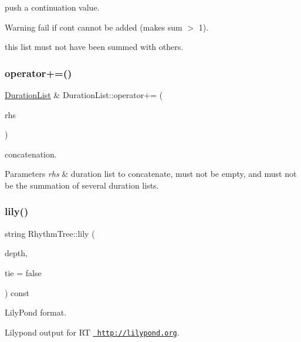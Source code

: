 push a continuation value. 

\begin{DoxyWarning}{Warning}
fail if cont cannot be added (makes sum $>$ 1). 

this list must not have been summed with others. 
\end{DoxyWarning}
\mbox{\label{group__output_ga06ae4f865c1c27edd490f1631d76452a}} 
\subsubsection{\texorpdfstring{operator+=()}{operator+=()}\hspace{0.1cm}{\footnotesize\ttfamily [1/2]}}
{\footnotesize\ttfamily \mbox{\hyperlink{classDurationList}{Duration\+List}} \& Duration\+List\+::operator+= (\begin{DoxyParamCaption}\item[{const \mbox{\hyperlink{classDurationList}{Duration\+List}} \&}]{rhs }\end{DoxyParamCaption})}



concatenation. 


\begin{DoxyParams}{Parameters}
{\em rhs} & duration list to concatenate, must not be empty, and must not be the summation of several duration lists. \\
\hline
\end{DoxyParams}
\mbox{\label{group__output_gafcd0d23d1cdb8cd92fbaec2fac51d259}} 
\subsubsection{\texorpdfstring{lily()}{lily()}}
{\footnotesize\ttfamily string Rhythm\+Tree\+::lily (\begin{DoxyParamCaption}\item[{int}]{depth,  }\item[{bool}]{tie = {\ttfamily false} }\end{DoxyParamCaption}) const}



Lily\+Pond format. 

Lilypond output for RT \href{http://lilypond.org}{\texttt{ http\+://lilypond.\+org}}. \mbox{\label{group__output_ga67acb233e47d9942cb678fb24b67f799}} 
